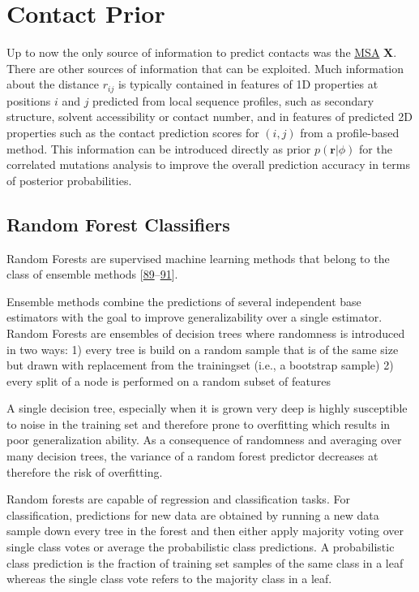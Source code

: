 \documentclass[12pt,a4paper,twoside]{book}
\renewcommand{\r}{\mathbf{r}}
\newcommand{\rij}{r_{ij}}
\newcommand{\X}{\mathbf{X}}
\theoremstyle{definition}
\theoremstyle{definition}
\theoremstyle{remark}
\begin{document}
\chapter{Contact Prior}\label{contact-prior}

Up to now the only source of information to predict contacts was the
\protect\hyperlink{abbrev}{MSA} \(\X\). There are other sources of
information that can be exploited. Much information about the distance
\(\rij\) is typically contained in features of 1D properties at
positions \(i\) and \(j\) predicted from local sequence profiles, such
as secondary structure, solvent accessibility or contact number, and in
features of predicted 2D properties such as the contact prediction
scores for \((i,j)\) from a profile-based method. This information can
be introduced directly as prior \(p(\r |\phi)\) for the correlated
mutations analysis to improve the overall prediction accuracy in terms
of posterior probabilities.

\section{Random Forest Classifiers}\label{random-forest-classifiers}

Random Forests are supervised machine learning methods that belong to
the class of ensemble methods
{[}\protect\hyperlink{ref-Ho1998}{89}--\protect\hyperlink{ref-Breiman2001}{91}{]}.

Ensemble methods combine the predictions of several independent base
estimators with the goal to improve generalizability over a single
estimator. Random Forests are ensembles of decision trees where
randomness is introduced in two ways: 1) every tree is build on a random
sample that is of the same size but drawn with replacement from the
trainingset (i.e., a bootstrap sample) 2) every split of a node is
performed on a random subset of features

A single decision tree, especially when it is grown very deep is highly
susceptible to noise in the training set and therefore prone to
overfitting which results in poor generalization ability. As a
consequence of randomness and averaging over many decision trees, the
variance of a random forest predictor decreases at therefore the risk of
overfitting.

Random forests are capable of regression and classification tasks. For
classification, predictions for new data are obtained by running a new
data sample down every tree in the forest and then either apply majority
voting over single class votes or average the probabilistic class
predictions. A probabilistic class prediction is the fraction of
training set samples of the same class in a leaf whereas the single
class vote refers to the majority class in a leaf.
\end{document}
